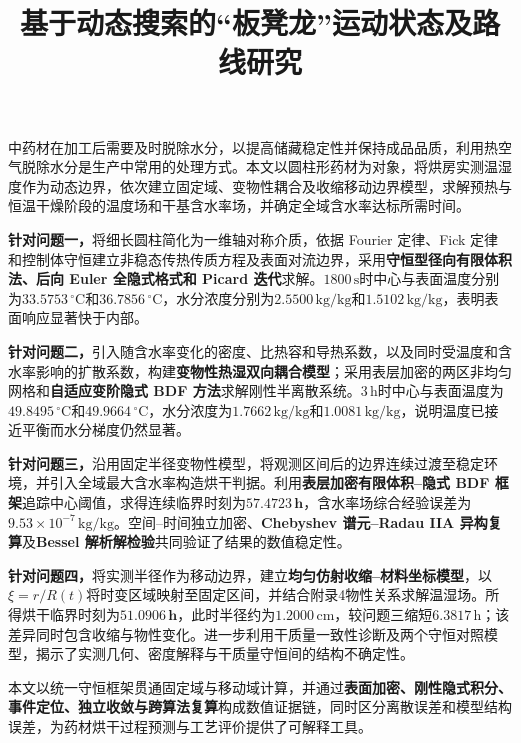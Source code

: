 \documentclass[withoutpreface,bwprint]{cumcmthesis}
\title{基于动态搜索的“板凳龙”运动状态及路线研究}
\makeatletter
\renewenvironment{abstract}{%
\if@twocolumn
    \section*{\abstractname}%
  \else
   \begin{center}%
  {\zihao{4}\bfseries \abstractname\vspace{-.5em}\vspace{\z@}}%
   \end{center}%
   \quotation
  \fi}
  {\if@twocolumn\else\endquotation\clearpage\fi}
\makeatother
\begin{document}
\maketitle

\begin{abstract}
中药材在加工后需要及时脱除水分，以提高储藏稳定性并保持成品品质，利用热空气脱除水分是生产中常用的处理方式。本文以圆柱形药材为对象，将烘房实测温湿度作为动态边界，依次建立固定域、变物性耦合及收缩移动边界模型，求解预热与恒温干燥阶段的温度场和干基含水率场，并确定全域含水率达标所需时间。

\textbf{针对问题一，}将细长圆柱简化为一维轴对称介质，依据 Fourier 定律、Fick 定律和控制体守恒建立非稳态传热传质方程及表面对流边界，采用\textbf{守恒型径向有限体积法、后向 Euler 全隐式格式和 Picard 迭代}求解。$1800\,\mathrm{s}$时中心与表面温度分别为$33.5753\,{}^\circ\mathrm{C}$和$36.7856\,{}^\circ\mathrm{C}$，水分浓度分别为$2.5500\,\mathrm{kg/kg}$和$1.5102\,\mathrm{kg/kg}$，表明表面响应显著快于内部。

\textbf{针对问题二，}引入随含水率变化的密度、比热容和导热系数，以及同时受温度和含水率影响的扩散系数，构建\textbf{变物性热湿双向耦合模型}；采用表层加密的两区非均匀网格和\textbf{自适应变阶隐式 BDF 方法}求解刚性半离散系统。$3\,\mathrm{h}$时中心与表面温度为$49.8495\,{}^\circ\mathrm{C}$和$49.9664\,{}^\circ\mathrm{C}$，水分浓度为$1.7662\,\mathrm{kg/kg}$和$1.0081\,\mathrm{kg/kg}$，说明温度已接近平衡而水分梯度仍然显著。

\textbf{针对问题三，}沿用固定半径变物性模型，将观测区间后的边界连续过渡至稳定环境，并引入全域最大含水率构造烘干判据。利用\textbf{表层加密有限体积--隐式 BDF 框架}追踪中心阈值，求得连续临界时刻为$\mathbf{57.4723\,h}$，含水率场综合经验误差为$9.53\times10^{-7}\,\mathrm{kg/kg}$。空间--时间独立加密、\textbf{Chebyshev 谱元--Radau IIA 异构复算}及\textbf{Bessel 解析解检验}共同验证了结果的数值稳定性。

\textbf{针对问题四，}将实测半径作为移动边界，建立\textbf{均匀仿射收缩--材料坐标模型}，以$\xi=r/R(t)$将时变区域映射至固定区间，并结合附录4物性关系求解温湿场。所得烘干临界时刻为$\mathbf{51.0906\,h}$，此时半径约为$1.2000\,\mathrm{cm}$，较问题三缩短$6.3817\,\mathrm{h}$；该差异同时包含收缩与物性变化。进一步利用干质量一致性诊断及两个守恒对照模型，揭示了实测几何、密度解释与干质量守恒间的结构不确定性。

本文以统一守恒框架贯通固定域与移动域计算，并通过\textbf{表面加密、刚性隐式积分、事件定位、独立收敛与跨算法复算}构成数值证据链，同时区分离散误差和模型结构误差，为药材烘干过程预测与工艺评价提供了可解释工具。

\end{abstract}
\end{document}
